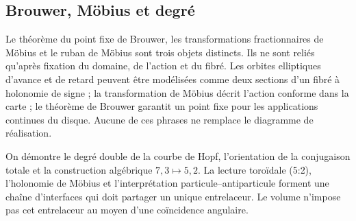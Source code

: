 \subsection{Brouwer, Möbius et degré}

Le théorème du point fixe de Brouwer, les transformations fractionnaires de
Möbius et le ruban de Möbius sont trois objets distincts. Ils ne sont reliés
qu’après fixation du domaine, de l’action et du fibré. Les orbites elliptiques d’avance et de
retard peuvent être modélisées comme deux sections d’un fibré à holonomie de
signe ; la transformation de Möbius décrit l’action conforme dans la carte ;
le théorème de Brouwer garantit un point fixe pour les applications continues du disque.
Aucune de ces phrases ne remplace le diagramme de réalisation.

\begin{remark}
On démontre le degré double de la courbe de Hopf, l’orientation de la
conjugaison totale et la construction algébrique \(7,3\mapsto5,2\). La lecture
toroïdale (5{:}2), l’holonomie de Möbius et l’interprétation
particule--antiparticule forment une chaîne d’interfaces qui doit partager un
unique entrelaceur. Le volume n’impose pas cet entrelaceur au moyen d’une
coïncidence angulaire.
\end{remark}
